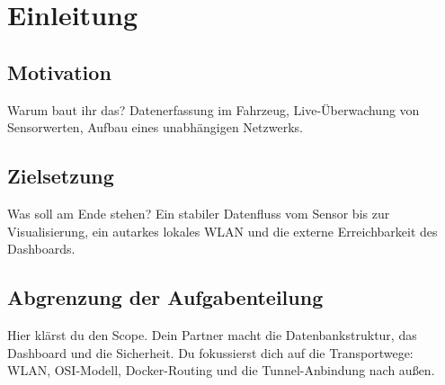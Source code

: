 
\chapter{Einleitung}


\section{Motivation}
Warum baut ihr das? Datenerfassung im Fahrzeug, Live-Überwachung von Sensorwerten, Aufbau eines unabhängigen Netzwerks.

\section{Zielsetzung}
Was soll am Ende stehen? Ein stabiler Datenfluss vom Sensor bis zur Visualisierung, ein autarkes lokales WLAN und die externe Erreichbarkeit des Dashboards.

\section{Abgrenzung der Aufgabenteilung}
Hier klärst du den Scope. Dein Partner macht die Datenbankstruktur, das Dashboard und die Sicherheit. Du fokussierst dich auf die Transportwege: WLAN, OSI-Modell, Docker-Routing und die Tunnel-Anbindung nach außen.

